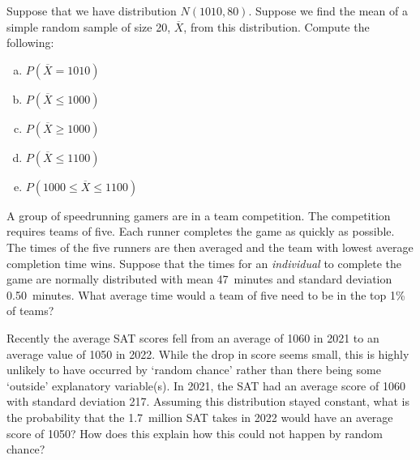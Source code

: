 \documentclass[11pt,letterpaper]{article}
\begin{document}

 Suppose that we have distribution $N(1010, 80)$. Suppose we find the mean of a simple random sample of size 20, $\overline{X}$, from this distribution. Compute the following:
	\begin{enumerate}[(a)]
	\item $P(\overline{X}= 1010)$
	\item $P(\overline{X} \leq 1000)$
	\item $P(\overline{X} \geq 1000)$
	\item $P(\overline{X} \leq 1100)$
	\item $P(1000 \leq \overline{X} \leq 1100)$
	\end{enumerate}



\newpage



 A group of speedrunning gamers are in a team competition. The competition requires teams of five. Each runner completes the game as quickly as possible. The times of the five runners are then averaged and the team with lowest average completion time wins. Suppose that the times for an \textit{individual} to complete the game are normally distributed with mean 47~minutes and standard deviation 0.50~minutes. What average time would a team of five need to be in the top 1\% of teams?



\newpage


 Recently the average SAT scores fell from an average of 1060 in 2021 to an average value of 1050 in 2022. While the drop in score seems small, this is highly unlikely to have occurred by `random chance' rather than there being some `outside' explanatory variable(s). In 2021, the SAT had an average score of 1060 with standard deviation 217. Assuming this distribution stayed constant, what is the probability that the 1.7~million SAT takes in 2022 would have an average score of 1050? How does this explain how this could not happen by random chance? 
\end{document}
